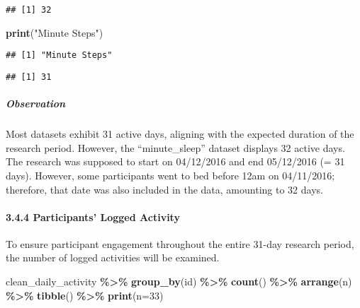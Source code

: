 \documentclass[
]{article}
\newenvironment{Shaded}{\begin{snugshade}}{\end{snugshade}}
\newcommand{\AttributeTok}[1]{\textcolor[rgb]{0.13,0.29,0.53}{#1}}
\newcommand{\DecValTok}[1]{\textcolor[rgb]{0.00,0.00,0.81}{#1}}
\newcommand{\FunctionTok}[1]{\textcolor[rgb]{0.13,0.29,0.53}{\textbf{#1}}}
\newcommand{\NormalTok}[1]{#1}
\newcommand{\SpecialCharTok}[1]{\textcolor[rgb]{0.81,0.36,0.00}{\textbf{#1}}}
\newcommand{\StringTok}[1]{\textcolor[rgb]{0.31,0.60,0.02}{#1}}
\begin{document}
\begin{verbatim}
## [1] 32
\end{verbatim}

\begin{Shaded}
\begin{Highlighting}[]
\FunctionTok{print}\NormalTok{(}\StringTok{"Minute Steps"}\NormalTok{)}
\end{Highlighting}
\end{Shaded}

\begin{verbatim}
## [1] "Minute Steps"
\end{verbatim}

\begin{Shaded}
\end{Shaded}

\begin{verbatim}
## [1] 31
\end{verbatim}

\hypertarget{observation-1}{%
\subparagraph{Observation}\label{observation-1}}

Most datasets exhibit 31 active days, aligning with the expected
duration of the research period. However, the ``minute\_sleep'' dataset
displays 32 active days. The research was supposed to start on
04/12/2016 and end 05/12/2016 (= 31 days). However, some participants
went to bed before 12am on 04/11/2016; therefore, that date was also
included in the data, amounting to 32 days.

\hypertarget{participants-logged-activity}{%
\paragraph{3.4.4 Participants' Logged
Activity}\label{participants-logged-activity}}

To ensure participant engagement throughout the entire 31-day research
period, the number of logged activities will be examined.

\begin{Shaded}
\begin{Highlighting}[]
\NormalTok{clean\_daily\_activity }\SpecialCharTok{\%\textgreater{}\%} 
  \FunctionTok{group\_by}\NormalTok{(id) }\SpecialCharTok{\%\textgreater{}\%} 
  \FunctionTok{count}\NormalTok{() }\SpecialCharTok{\%\textgreater{}\%} 
  \FunctionTok{arrange}\NormalTok{(n) }\SpecialCharTok{\%\textgreater{}\%} 
  \FunctionTok{tibble}\NormalTok{() }\SpecialCharTok{\%\textgreater{}\%} 
  \FunctionTok{print}\NormalTok{(}\AttributeTok{n=}\DecValTok{33}\NormalTok{)}
\end{Highlighting}
\end{Shaded}
\end{document}
